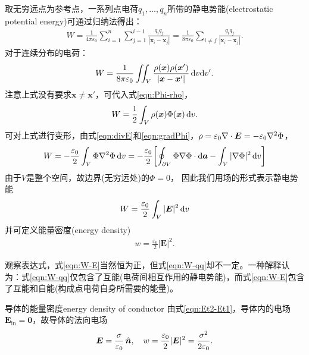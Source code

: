 取无穷远点为参考点，一系列点电荷$q_1,\ldots,q_n$所带的静电势能(electrostatic potential energy)可通过归纳法得出：
\begin{align}
    W=\frac1{4\pi\varepsilon_0}\sum_{i=1}^n\sum_{j=1}^{i-1}\frac{q_iq_j}{|\bm x_i-\bm x_j|}=\frac1{8\pi\varepsilon_0}\sum_{i\neq j}\frac{q_iq_j}{|\bm x_i-\bm x_j|}.
\end{align}
对于连续分布的电荷：
\begin{align*}
    \label{eqn:W-qq}
    W=\frac1{8\pi\varepsilon_0}\iint_V\frac{\rho(\bm x)\rho(\bm x')}{|\bm x-\bm x'|}\mathop{}\!\mathrm{d} v\mathrm{d} v'.
\end{align*}
注意上式没有要求$\bm x\neq\bm x'$，可代入式\eqref{eqn:Phi-rho}，
\begin{align}
    W=\frac12\int_V\rho(\bm x)\Phi(\bm x)\mathop{}\!\mathrm{d} v.
\end{align}
可对上式进行变形，由式\eqref{eqn:divE}和\eqref{eqn:gradPhi}，$\rho=\varepsilon_0\nabla\cdot\bm E=-\varepsilon_0\nabla^2\Phi$，
\begin{align*}
    W=-\frac{\varepsilon_0}2\int_V\Phi\nabla^2\Phi\mathop{}\!\mathrm{d} v=-\frac{\varepsilon_0}2\biggl[\oint_{\partial V}\Phi\nabla\Phi\cdot\mathop{}\!\mathrm{d}\bm a-\int_V|\nabla\Phi|^2\mathop{}\!\mathrm{d} v\biggr]
\end{align*}
由于$V$是整个空间，故边界(无穷远处)的$\Phi=0$，
因此我们用场的形式表示静电势能
\begin{align}
    \label{eqn:W-E}
    W=\frac{\varepsilon_0}2\int_V|\bm E|^2\mathop{}\!\mathrm{d} v
\end{align}
并可定义能量密度(energy density)
\begin{align}
    w=\frac{\varepsilon_0}2|\bm E|^2.
\end{align}

观察表达式，式\eqref{eqn:W-E}当然恒为正，但式\eqref{eqn:W-qq}却不一定。一种解释认为：式\eqref{eqn:W-qq}仅包含了互能(电荷间相互作用的静电势能)，而式\eqref{eqn:W-E}包含了互能和自能(构成点电荷自身所需要的能量)。
\begin{example}{导体的能量密度}{energy density of conductor}
    由式\eqref{eqn:Et2-Et1}，导体内的电场$\bm E_\text{in}=\bm 0$，故导体的法向电场
    \[
        \bm E=\frac\sigma{\varepsilon_0}\mathop{}\!\hat{\bm{n}},\quad w=\frac{\varepsilon_0}2|\bm E|^2=\frac{\sigma^2}{2\varepsilon_0}.
    \]
\end{example}


